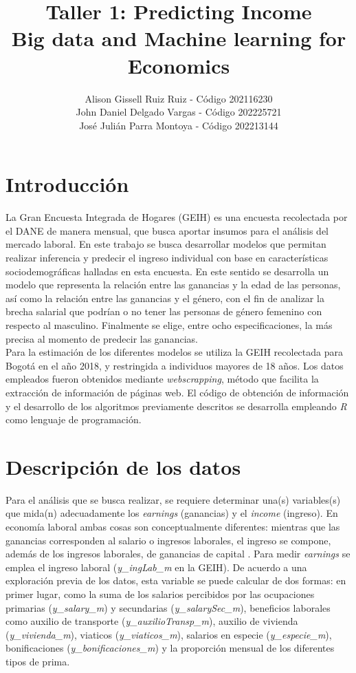 \documentclass[11pt,a4paper]{article}
\title{\bf Taller 1: Predicting Income \\ Big data and Machine learning for Economics}
\author{Alison Gissell Ruiz Ruiz - Código 202116230\\ 
John Daniel Delgado Vargas - Código 202225721\\
José Julián Parra Montoya - Código 202213144 }
\date{}
\begin{document}
\maketitle

\section{Introducción}

La Gran Encuesta Integrada de Hogares (GEIH) es una encuesta recolectada por el DANE de manera mensual, que busca aportar insumos para el análisis del mercado laboral. En este trabajo se busca desarrollar modelos que permitan realizar inferencia y predecir el ingreso individual con base en características sociodemográficas halladas en esta encuesta. En este sentido se desarrolla un modelo que representa la relación entre las ganancias y la edad de las personas, así como la relación entre las ganancias y el género, con el fin de analizar la brecha salarial que podrían o no tener las personas de género femenino con respecto al masculino. Finalmente se elige, entre ocho especificaciones, la más precisa al momento de predecir las ganancias. \\

Para la estimación de los diferentes modelos se utiliza la GEIH recolectada para Bogotá en el año 2018, y restringida a individuos mayores de 18 años. Los datos empleados fueron obtenidos mediante \emph{webscrapping}, método que facilita la extracción de información de páginas web. El código de obtención de información y el desarrollo de los algoritmos previamente descritos se desarrolla empleando \emph{R} como lenguaje de programación.\\

\section{Descripción de los datos}


Para el análisis que se busca realizar, se requiere determinar una(s) variables(s) que mida(n) adecuadamente los \emph{earnings} (ganancias) y el \emph{income} (ingreso). En economía laboral ambas cosas son conceptualmente diferentes: mientras que las ganancias corresponden al salario o ingresos laborales, el ingreso se compone, además de los ingresos laborales, de ganancias de capital \citep{angrist1999}. Para medir \emph{earnings} se emplea el ingreso laboral (\textit{y\_ingLab\_m} en la GEIH). De acuerdo a una exploración previa de los datos, esta variable se puede calcular de dos formas: en primer lugar, como la suma de los salarios 
percibidos por las ocupaciones primarias (\textit{y\_salary\_m}) y secundarias (\textit{y\_salarySec\_m}), beneficios laborales como auxilio de transporte (\textit{y\_auxilioTransp\_m}), auxilio de vivienda (\textit{y\_vivienda\_m}), viaticos (\textit{y\_viaticos\_m}), salarios en especie (\textit{y\_especie\_m}), 
bonificaciones (\textit{y\_bonificaciones\_m}) y la proporción mensual de los diferentes tipos de prima. \\
\end{document}
